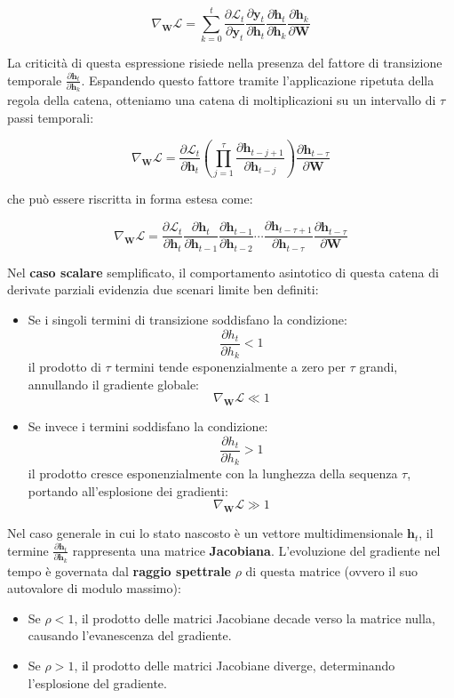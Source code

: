 ﻿\documentclass[11pt, a4paper]{article}
\begin{document}
\[
\nabla_{\bm{W}}\mathcal{L} = \sum_{k=0}^t \frac{\partial \mathcal{L}_t}{\partial \bm{y}_t} \frac{\partial \bm{y}_t}{\partial \bm{h}_t} \frac{\partial \bm{h}_t}{\partial \bm{h}_k} \frac{\partial \bm{h}_k}{\partial \bm{W}}
\]

La criticità di questa espressione risiede nella presenza del fattore di transizione temporale $\frac{\partial \bm{h}_t}{\partial \bm{h}_k}$. Espandendo questo fattore tramite l'applicazione ripetuta della regola della catena, otteniamo una catena di moltiplicazioni su un intervallo di $\tau$ passi temporali:

\[
\nabla_{\bm{W}}\mathcal{L} = \frac{\partial \mathcal{L}_t}{\partial \bm{h}_t} \left( \prod_{j=1}^{\tau} \frac{\partial \bm{h}_{t-j+1}}{\partial \bm{h}_{t-j}} \right) \frac{\partial \bm{h}_{t-\tau}}{\partial \bm{W}}
\]

che può essere riscritta in forma estesa come:

\[
\nabla_{\bm{W}}\mathcal{L} = \frac{\partial \mathcal{L}_t}{\partial \bm{h}_t} \frac{\partial \bm{h}_t}{\partial \bm{h}_{t-1}} \frac{\partial \bm{h}_{t-1}}{\partial \bm{h}_{t-2}} \cdots \frac{\partial \bm{h}_{t-\tau+1}}{\partial \bm{h}_{t-\tau}} \frac{\partial \bm{h}_{t-\tau}}{\partial \bm{W}}
\]

Nel \textbf{caso scalare} semplificato, il comportamento asintotico di questa catena di derivate parziali evidenzia due scenari limite ben definiti:
\begin{itemize}
    \item Se i singoli termini di transizione soddisfano la condizione:
    \[
    \frac{\partial h_t}{\partial h_k} < 1
    \]
    il prodotto di $\tau$ termini tende esponenzialmente a zero per $\tau$ grandi, annullando il gradiente globale:
    \[
    \nabla_{\bm{W}}\mathcal{L} \ll 1
    \]
    \item Se invece i termini soddisfano la condizione:
    \[
    \frac{\partial h_t}{\partial h_k} > 1
    \]
    il prodotto cresce esponenzialmente con la lunghezza della sequenza $\tau$, portando all'esplosione dei gradienti:
    \[
    \nabla_{\bm{W}}\mathcal{L} \gg 1
    \]
\end{itemize}

Nel caso generale in cui lo stato nascosto è un vettore multidimensionale $\bm{h}_t$, il termine $\frac{\partial \bm{h}_t}{\partial \bm{h}_k}$ rappresenta una matrice \textbf{Jacobiana}. L'evoluzione del gradiente nel tempo è governata dal \textbf{raggio spettrale} $\rho$ di questa matrice (ovvero il suo autovalore di modulo massimo):
\begin{itemize}[noitemsep]
    \item Se $\rho < 1$, il prodotto delle matrici Jacobiane decade verso la matrice nulla, causando l'evanescenza del gradiente.
    \item Se $\rho > 1$, il prodotto delle matrici Jacobiane diverge, determinando l'esplosione del gradiente.
\end{itemize}
\end{document}
